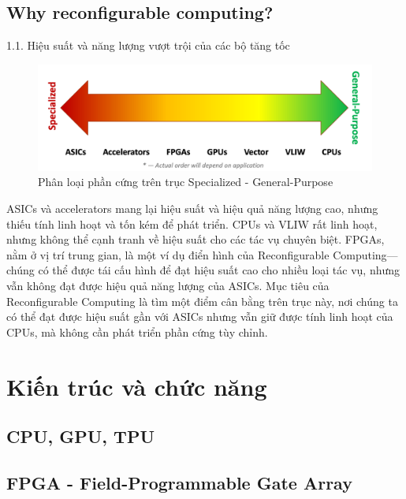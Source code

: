 \documentclass[a4paper]{article}
\begin{document}
\subsection{Why reconfigurable computing?}
1.1. Hiệu suất và năng lượng vượt trội của các bộ tăng tốc
\begin{figure}[H]
    \centering
    \includegraphics[width=1\linewidth]{assets/phanloai.png}
    \caption{Phân loại phần cứng trên trục Specialized - General-Purpose}
    \label{fig:enter-label}
\end{figure}
ASICs và accelerators mang lại hiệu suất và hiệu quả năng lượng cao, nhưng thiếu tính linh hoạt và tốn kém để phát triển. CPUs và VLIW rất linh hoạt, nhưng không thể cạnh tranh về hiệu suất cho các tác vụ chuyên biệt. FPGAs, nằm ở vị trí trung gian, là một ví dụ điển hình của Reconfigurable Computing—chúng có thể được tái cấu hình để đạt hiệu suất cao cho nhiều loại tác vụ, nhưng vẫn không đạt được hiệu quả năng lượng của ASICs. Mục tiêu của Reconfigurable Computing là tìm một điểm cân bằng trên trục này, nơi chúng ta có thể đạt được hiệu suất gần với ASICs nhưng vẫn giữ được tính linh hoạt của CPUs, mà không cần phát triển phần cứng tùy chỉnh.
\section{Kiến trúc và chức năng}
\subsection{CPU, GPU, TPU}
\subsection{FPGA - Field-Programmable Gate Array}
\end{document}
